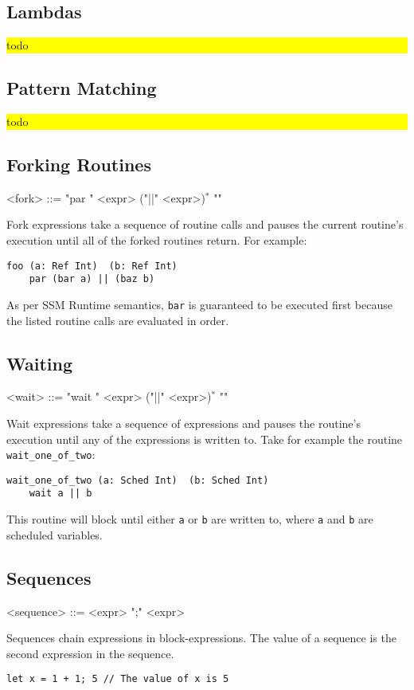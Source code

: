 \documentclass{article}
\newcommand{\fixme}[1]{
  \noindent\colorbox{yellow}{\parbox{\dimexpr\linewidth-2\fboxsep}{#1}}%
}
\begin{document}
\subsection{Lambdas}
\fixme{todo}
\subsection{Pattern Matching}
\fixme{todo}
\subsection{Forking Routines}
\begin{grammar}
<fork> ::= "par {" <expr> ("||" <expr>)$^{*}$ "}"
\end{grammar}
Fork expressions take a sequence of routine calls and pauses the current routine's execution until all of the forked routines return. For example:
\begin{lstlisting}
foo (a: Ref Int)  (b: Ref Int)
    par (bar a) || (baz b)
\end{lstlisting}
As per SSM Runtime semantics, \texttt{bar} is guaranteed to be executed first because the listed routine calls are evaluated in order.
\subsection{Waiting}
\begin{grammar}
<wait> ::= "wait {" <expr> ("||" <expr>)$^{*}$ "}"
\end{grammar}
Wait expressions take a sequence of expressions and pauses the routine's execution until any of the expressions is written to. Take for example the routine \texttt{wait_one_of_two}:
\begin{lstlisting}
wait_one_of_two (a: Sched Int)  (b: Sched Int)
    wait a || b
\end{lstlisting}
This routine will block until either \texttt{a} or \texttt{b} are written to, where \texttt{a} and  \texttt{b} are scheduled variables.

\subsection{Sequences}
\begin{grammar}
<sequence> ::= <expr> ";" <expr>
\end{grammar}
Sequences chain expressions in block-expressions. The value of a sequence is the second expression in the sequence.
\begin{lstlisting}
let x = 1 + 1; 5 // The value of x is 5
\end{lstlisting}
\end{document}
